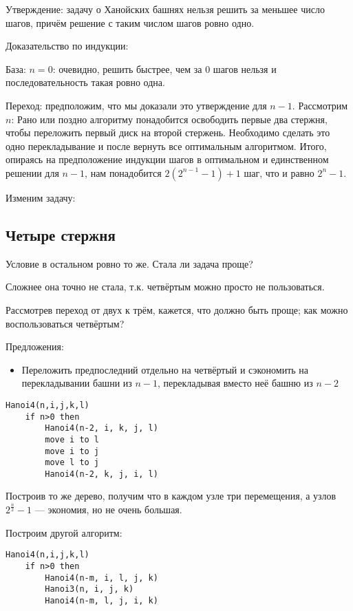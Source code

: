 \documentclass[11pt,a4paper]{article}
\begin{document}
Утверждение: задачу о Ханойских башнях нельзя решить за меньшее число шагов, причём решение с таким числом шагов ровно одно.

Доказательство по индукции:

База: $n=0$: очевидно, решить быстрее, чем за 0 шагов нельзя и последовательность такая ровно одна.

Переход: предположим, что мы доказали это утверждение для $n-1$. Рассмотрим $n$:
Рано или поздно алгоритму понадобится освободить первые два стержня, чтобы переложить первый диск на второй стержень. Необходимо сделать это одно перекладывание и после вернуть все оптимальным алгоритмом. Итого, опираясь на предположение индукции шагов в оптимальном и единственном решении для $n-1$, нам понадобится $2\left( 2^{n-1} - 1 \right)+1$ шаг, что и равно $2^n -1$.

Изменим задачу:
\subsection*{Четыре стержня}
Условие в остальном ровно то же. 
Стала ли задача проще?

Сложнее она точно не стала, т.к. четвёртым можно просто не пользоваться.

Рассмотрев переход от двух к трём, кажется, что должно быть проще; как можно воспользоваться четвёртым?

Предложения:
\begin{itemize}
    \item Переложить предпоследний отдельно на четвёртый и сэкономить на перекладывании башни из $n-1$, перекладывая вместо неё башню из $n-2$
\end{itemize}


\begin{lstlisting}
Hanoi4(n,i,j,k,l)
    if n>0 then
        Hanoi4(n-2, i, k, j, l)
        move i to l
        move i to j
        move l to j
        Hanoi4(n-2, k, j, i, l)
\end{lstlisting}

Построив то же дерево, получим что в каждом узле три перемещения, а узлов $2^{\frac{n}2}-1$ --- экономия, но не очень большая.

Построим другой алгоритм:

\begin{lstlisting}
Hanoi4(n,i,j,k,l)
    if n>0 then
        Hanoi4(n-m, i, l, j, k)
        Hanoi3(n, i, j, k)
        Hanoi4(n-m, l, j, i, k)
\end{lstlisting}
\end{document}
